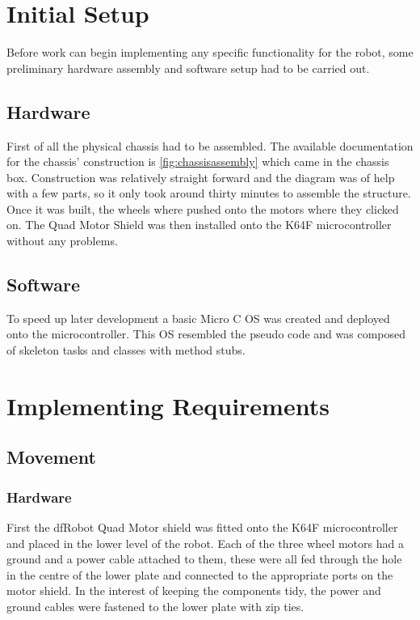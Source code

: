 		\section{Initial Setup}
		Before work can begin implementing any specific functionality for the robot, some preliminary hardware assembly and software setup had to be carried out.
			
			\subsection{Hardware}
			First of all the physical chassis had to be assembled. The available documentation for the chassis' construction is \ref{fig:chassisassembly} which came in the chassis box. Construction was relatively straight forward and the diagram was of help with a few parts, so it only took around thirty minutes to assemble the structure. Once it was built, the wheels where pushed onto the motors where they clicked on. The Quad Motor Shield was then installed onto the K64F microcontroller without any problems.
				
			\subsection{Software}
			To speed up later development a basic Micro C OS was created and deployed onto the microcontroller. This OS resembled the pseudo code and was composed of skeleton tasks and classes with method stubs.
			
		\section{Implementing Requirements}
			\subsection{Movement}
				\subsubsection{Hardware}
				First the dfRobot Quad Motor shield was fitted onto the K64F microcontroller and placed in the lower level of the robot. Each of the three wheel motors had a ground and a power cable attached to them, these were all fed through the hole in the centre of the lower plate and connected to the appropriate ports on the motor shield. In the interest of keeping the components tidy, the power and ground cables were fastened to the lower plate with zip ties.
				
